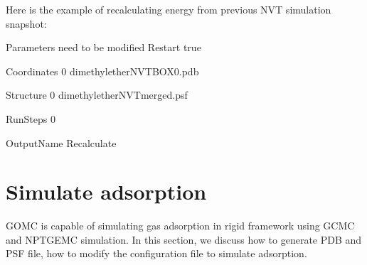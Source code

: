 \documentclass[letterpaper,10pt,english]{sphinxmanual}
\begin{document}
\sphinxAtStartPar
Here is the example of recalculating energy from previous NVT simulation snapshot:

\begin{sphinxVerbatim}[commandchars=\\\{\}]
\PYGZsh{}\PYGZsh{}\PYGZsh{}\PYGZsh{}\PYGZsh{}\PYGZsh{}\PYGZsh{}\PYGZsh{}\PYGZsh{}\PYGZsh{}\PYGZsh{}\PYGZsh{}\PYGZsh{}\PYGZsh{}\PYGZsh{}\PYGZsh{}\PYGZsh{}\PYGZsh{}\PYGZsh{}\PYGZsh{}\PYGZsh{}\PYGZsh{}\PYGZsh{}\PYGZsh{}\PYGZsh{}\PYGZsh{}\PYGZsh{}\PYGZsh{}\PYGZsh{}\PYGZsh{}\PYGZsh{}\PYGZsh{}\PYGZsh{}\PYGZsh{}\PYGZsh{}\PYGZsh{}\PYGZsh{}\PYGZsh{}\PYGZsh{}\PYGZsh{}\PYGZsh{}\PYGZsh{}\PYGZsh{}\PYGZsh{}\PYGZsh{}\PYGZsh{}\PYGZsh{}\PYGZsh{}\PYGZsh{}\PYGZsh{}\PYGZsh{}\PYGZsh{}\PYGZsh{}\PYGZsh{}\PYGZsh{}\PYGZsh{}
\PYGZsh{} Parameters need to be modified
\PYGZsh{}\PYGZsh{}\PYGZsh{}\PYGZsh{}\PYGZsh{}\PYGZsh{}\PYGZsh{}\PYGZsh{}\PYGZsh{}\PYGZsh{}\PYGZsh{}\PYGZsh{}\PYGZsh{}\PYGZsh{}\PYGZsh{}\PYGZsh{}\PYGZsh{}\PYGZsh{}\PYGZsh{}\PYGZsh{}\PYGZsh{}\PYGZsh{}\PYGZsh{}\PYGZsh{}\PYGZsh{}\PYGZsh{}\PYGZsh{}\PYGZsh{}\PYGZsh{}\PYGZsh{}\PYGZsh{}\PYGZsh{}\PYGZsh{}\PYGZsh{}\PYGZsh{}\PYGZsh{}\PYGZsh{}\PYGZsh{}\PYGZsh{}\PYGZsh{}\PYGZsh{}\PYGZsh{}\PYGZsh{}\PYGZsh{}\PYGZsh{}\PYGZsh{}\PYGZsh{}\PYGZsh{}\PYGZsh{}\PYGZsh{}\PYGZsh{}\PYGZsh{}\PYGZsh{}\PYGZsh{}\PYGZsh{}\PYGZsh{}
Restart         true

Coordinates     0   dimethylether\PYGZus{}NVT\PYGZus{}BOX\PYGZus{}0.pdb

Structure       0   dimethylether\PYGZus{}NVT\PYGZus{}merged.psf

RunSteps        0

OutputName          Recalculate
\end{sphinxVerbatim}


\section{Simulate adsorption}
\label{\detokenize{howto:simulate-adsorption}}
\sphinxAtStartPar
GOMC is capable of simulating gas adsorption in rigid framework using GCMC and NPT\sphinxhyphen{}GEMC simulation. In this section, we discuss how to generate PDB and PSF file,
how to modify the configuration file to simulate adsorption.
\end{document}
